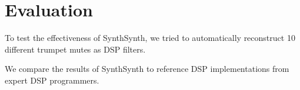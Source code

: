 \section{Evaluation}

To test the effectiveness of SynthSynth, we tried to automatically reconstruct 10 different trumpet mutes as DSP filters.

We compare the results of SynthSynth to reference DSP implementations from expert DSP programmers.
